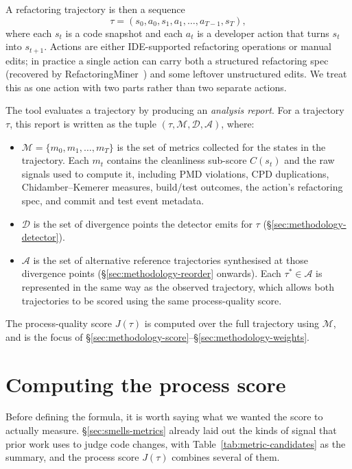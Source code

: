 A refactoring trajectory is then a sequence
\[
\tau = (s_0, a_0, s_1, a_1, \ldots, a_{T-1}, s_T),
\]
where each $s_t$ is a code snapshot and each $a_t$ is a developer action that turns $s_t$ into $s_{t+1}$. Actions are either IDE-supported refactoring operations or manual edits; in practice a single action can carry both a structured refactoring spec (recovered by RefactoringMiner~\cite{alikhanifard2025rminer}) and some leftover unstructured edits. We treat this as one action with two parts rather than two separate actions.

The tool evaluates a trajectory by producing an \emph{analysis report}. For a trajectory $\tau$, this report is written as the tuple $(\tau, \mathcal{M}, \mathcal{D}, \mathcal{A})$, where:
\begin{itemize}
  \item $\mathcal{M} = \{m_0, m_1, \ldots, m_T\}$ is the set of metrics collected for the states in the trajectory. Each $m_t$ contains the cleanliness sub-score $C(s_t)$ and the raw signals used to compute it, including PMD violations, CPD duplications, Chidamber--Kemerer measures, build/test outcomes, the action's refactoring spec, and commit and test event metadata.
  \item $\mathcal{D}$ is the set of divergence points the detector emits for $\tau$ (\S\ref{sec:methodology-detector}).
  \item $\mathcal{A}$ is the set of alternative reference trajectories synthesised at those divergence points (\S\ref{sec:methodology-reorder} onwards). Each $\tau^\ast \in \mathcal{A}$ is represented in the same way as the observed trajectory, which allows both trajectories to be scored using the same process-quality score.
\end{itemize}

The process-quality score $J(\tau)$ is computed over the full trajectory using $\mathcal{M}$, and is the focus of \S\ref{sec:methodology-score}--\S\ref{sec:methodology-weights}.

\section{Computing the process score}
\label{sec:methodology-process-score-section}

Before defining the formula, it is worth saying what we wanted the score to actually measure. \S\ref{sec:smells-metrics} already laid out the kinds of signal that prior work uses to judge code changes, with Table~\ref{tab:metric-candidates} as the summary, and the process score $J(\tau)$ combines several of them.


